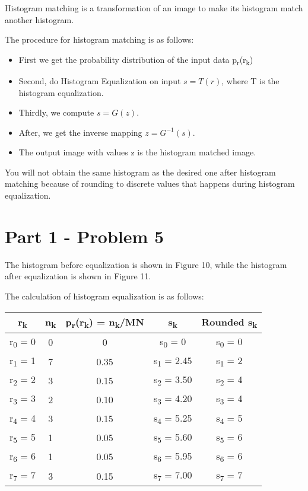 \documentclass[conference]{IEEEtran}
\begin{document}
Histogram matching is a transformation of an image to make its histogram match another histogram.

The procedure for histogram matching is as follows:
\begin{itemize}
  \item First we get the probability distribution of the input data p\textsubscript{r}(r\textsubscript{k})
  \item Second, do Histogram Equalization on input $s=T(r)$, where T is the histogram equalization.
  \item Thirdly, we compute $s=G(z)$.
  \item After, we get the inverse mapping $z=G^{-1}(s)$.
  \item The output image with values z is the histogram matched image.
\end{itemize}

You will not obtain the same histogram as the desired one after histogram matching because of rounding to discrete values that happens during histogram equalization.

\section*{Part 1 - Problem 5}

The histogram before equalization is shown in Figure 10, while the histogram after equalization is shown in Figure 11.

The calculation of histogram equalization is as follows: 
\hfill

\begin{center}
\begin{tabular}{ |c|c|c|c|c| } 
\hline
r\textsubscript{k} & n\textsubscript{k} & p\textsubscript{r}(r\textsubscript{k}) = n\textsubscript{k}/MN & s\textsubscript{k} & Rounded s\textsubscript{k}\\
\hline
r\textsubscript{0} = 0 & 0 & 0 & s\textsubscript{0} = 0 & s\textsubscript{0} = 0\\ 
r\textsubscript{1} = 1 & 7 & 0.35 & s\textsubscript{1} = 2.45 & s\textsubscript{1} = 2\\
r\textsubscript{2} = 2 & 3 & 0.15 & s\textsubscript{2} = 3.50 & s\textsubscript{2} = 4\\
r\textsubscript{3} = 3 & 2 & 0.10 & s\textsubscript{3} = 4.20 & s\textsubscript{3} = 4\\
r\textsubscript{4} = 4 & 3 & 0.15 & s\textsubscript{4} = 5.25 & s\textsubscript{4} = 5\\
r\textsubscript{5} = 5 & 1 & 0.05 & s\textsubscript{5} = 5.60 & s\textsubscript{5} = 6\\
r\textsubscript{6} = 6 & 1 & 0.05 & s\textsubscript{6} = 5.95 & s\textsubscript{6} = 6\\
r\textsubscript{7} = 7 & 3 & 0.15 & s\textsubscript{7} = 7.00 & s\textsubscript{7} = 7\\
\hline
\end{tabular}
\end{center}
\end{document}
